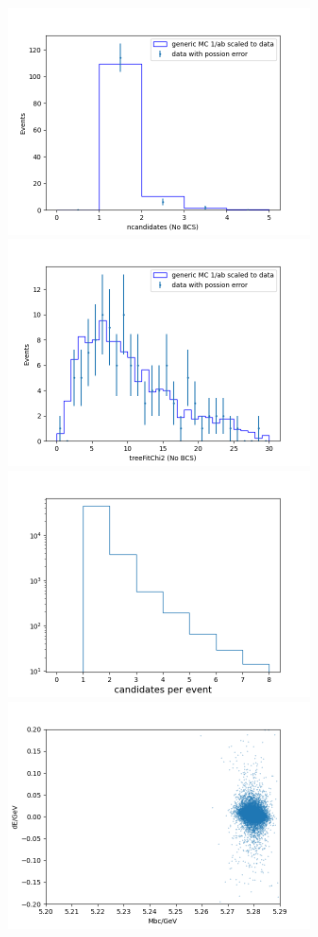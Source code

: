 \begin{figure}[H]
	\begin{minipage}[b]{0.5\linewidth}
		\centering 
		\includegraphics[height=6cm]{figures/best_ncands_noBCS}
		
	\end{minipage}
	\begin{minipage}[b]{0.5\linewidth}
		\centering 
		\includegraphics[height=6cm]{figures/best_treeFitChi2_noBCS}
		
	\end{minipage}
	\begin{minipage}[b]{0.5\linewidth}
		\centering 
		\includegraphics[height=6cm]{figures/best_cands}
		
	\end{minipage}
	\begin{minipage}[b]{0.5\linewidth}
		\centering 
		\includegraphics[height=6cm]{figures/hist_sig_MC_Mbc_dE}
		

\end{minipage}
\end{figure}
